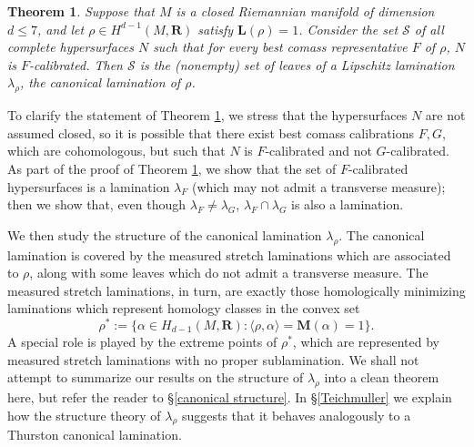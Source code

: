 \documentclass[reqno,11pt]{amsart}
\newcommand{\RR}{\mathbf{R}}
\newcommand{\Mass}{\mathbf M}
\newcommand{\Comass}{\mathbf L}
\newcommand{\dfn}[1]{\emph{#1}\index{#1}}
\newtheorem{mainthm}{Theorem}
\theoremstyle{definition}
\numberwithin{equation}{section}
\begin{document}
\begin{mainthm}\label{existence of calibrated lam}
Suppose that $M$ is a closed Riemannian manifold of dimension $d \leq 7$, and let $\rho \in H^{d - 1}(M, \RR)$ satisfy $\Comass(\rho) = 1$.
Consider the set $\mathscr S$ of all complete hypersurfaces $N$ such that for every best comass representative $F$ of $\rho$, $N$ is $F$-calibrated.
Then $\mathscr S$ is the (nonempty) set of leaves of a Lipschitz lamination $\lambda_\rho$, the \dfn{canonical lamination} of $\rho$.
\end{mainthm}

To clarify the statement of Theorem \ref{existence of calibrated lam}, we stress that the hypersurfaces $N$ are not assumed closed, so it is possible that there exist best comass calibrations $F, G$, which are cohomologous, but such that $N$ is $F$-calibrated and not $G$-calibrated.
As part of the proof of Theorem \ref{existence of calibrated lam}, we show that the set of $F$-calibrated hypersurfaces is a lamination $\lambda_F$ (which may not admit a transverse measure); then we show that, even though $\lambda_F \neq \lambda_G$, $\lambda_F \cap \lambda_G$ is also a lamination.

We then study the structure of the canonical lamination $\lambda_\rho$.
The canonical lamination is covered by the measured stretch laminations which are associated to $\rho$, along with some leaves which do not admit a transverse measure.
The measured stretch laminations, in turn, are exactly those homologically minimizing laminations which represent homology classes in the convex set 
$$\rho^* := \{\alpha \in H_{d - 1}(M, \RR): \langle \rho, \alpha\rangle = \Mass(\alpha) = 1\}.$$
A special role is played by the extreme points of $\rho^*$, which are represented by measured stretch laminations with no proper sublamination.
We shall not attempt to summarize our results on the structure of $\lambda_\rho$ into a clean theorem here, but refer the reader to \S\ref{canonical structure}.
In \S\ref{Teichmuller} we explain how the structure theory of $\lambda_\rho$ suggests that it behaves analogously to a Thurston canonical lamination.

\end{document}
